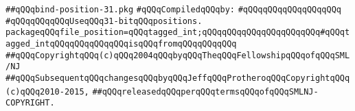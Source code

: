 \label{src/lib/std/types-only/bind-position-31.pkg}
\verb|##qQQqbind-position-31.pkg|\newline
\newline
\verb|#qQQqCompiledqQQqby:|\newline
\verb|#qQQqqQQqqQQqqQQqqQQq|\newline
\newline
\verb|#qQQqqQQqqQQqUseqQQq31-bitqQQqpositions.|\newline
\newline
\newline
\verb|packageqQQqfile_position=qQQqtagged_int;qQQqqQQqqQQqqQQqqQQqqQQq#qQQqtagged_intqQQqqQQqqQQqqQQqisqQQqfromqQQqqQQqqQQq|\newline
\newline
\newline
\newline
\verb|##qQQqCopyrightqQQq(c)qQQq2004qQQqbyqQQqTheqQQqFellowshipqQQqofqQQqSML/NJ|\newline
\verb|##qQQqSubsequentqQQqchangesqQQqbyqQQqJeffqQQqProtheroqQQqCopyrightqQQq(c)qQQq2010-2015,|\newline
\verb|##qQQqreleasedqQQqperqQQqtermsqQQqofqQQqSMLNJ-COPYRIGHT.|\newline

